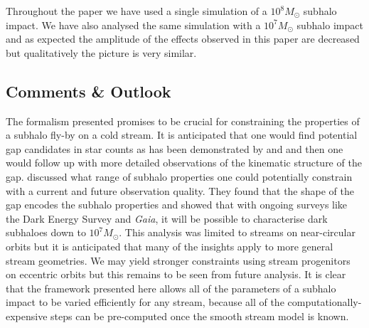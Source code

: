 \documentclass[useAMS,usenatbib,fleqn,a4paper]{mn2e}
\begin{document}
Throughout the paper we have used a single simulation of a $10^8M_\odot$ subhalo impact. We have also analysed the same simulation with a $10^7M_\odot$ subhalo impact and as expected the amplitude of the effects observed in this paper are decreased but qualitatively the picture is very similar.

\subsection{Comments \& Outlook}

The formalism presented promises to be crucial for constraining the properties of a subhalo fly-by on a cold stream. It is anticipated that one would find potential gap candidates in star counts as has been demonstrated by \citet{CarlbergPal52012} and \citet{CarlbergGD12013} and then one would follow up with more detailed observations of the kinematic structure of the gap. \cite{ErkalBelokurov2015b} discussed what range of subhalo properties one could potentially constrain with a current and future observation quality. They found that the shape of the gap encodes the subhalo properties and showed that with ongoing surveys like the Dark Energy Survey and \textit{Gaia}, it will be possible to characterise dark subhaloes down to $10^7M_\odot$. This analysis was limited to streams on near-circular orbits but it is anticipated that many of the insights apply to more general stream geometries. We may yield stronger constraints using stream progenitors on eccentric orbits but this remains to be seen from future analysis. It is clear that the framework presented here allows all of the parameters of a subhalo impact to be varied efficiently for any stream, because all of the computationally-expensive steps can be pre-computed once the smooth stream model is known.
\end{document}
